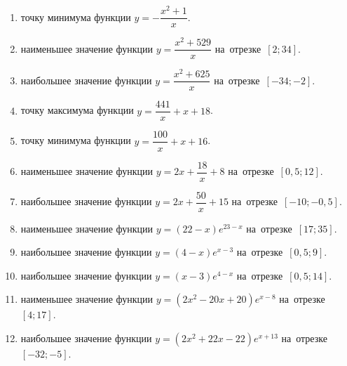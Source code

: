 \documentclass[a4paper,10pt]{article}
\begin{document}
\begin{enumerate}
\item {} точку минимума функции $y=-\dfrac{x^2 +1}{x}$.

\item {} наименьшее значение функции $y=\dfrac{x^2 +529}{x}$ на~отрезке~$\left[2;34\right]$.

\item {} наибольшее значение функции $y=\dfrac{x^2 +625}{x}$ на~отрезке~$\left[-34;-2\right]$.

\item {} точку максимума функции $y=\dfrac{441}{x} +x+18$.







\item {} точку минимума функции $y=\dfrac{100}{x} +x+16$.







\item {} наименьшее значение функции $y=2x+\dfrac{18}{x} +8$ на~отрезке~$\left[0,5;12\right]$.







\item {} наибольшее значение функции $y=2x+\dfrac{50}{x} +15$ на~отрезке~$\left[-10;-0,5\right]$.







\item {} наименьшее значение функции $y=\left(22-x\right)e^{23-x}$ на~отрезке~$\left[17;35\right]$.

\item {} наибольшее значение функции $y=\left(4-x\right)e^{x-3}$ на~отрезке~$\left[0,5;9\right]$.

\item {} наибольшее значение функции $y=\left(x-3\right)e^{4-x}$ на~отрезке~$\left[0,5;14\right]$.

\item {} наименьшее значение функции $y=\left(2x^2 -20x +20\right)e^{x -8}$ на~отрезке~$\left[4;17\right]$.

\item {} наибольшее значение функции $y=\left(2x^2 +22x -22\right)e^{x+13}$ на~отрезке~$\left[-32;-5\right]$.


\end{enumerate}
\end{document}
